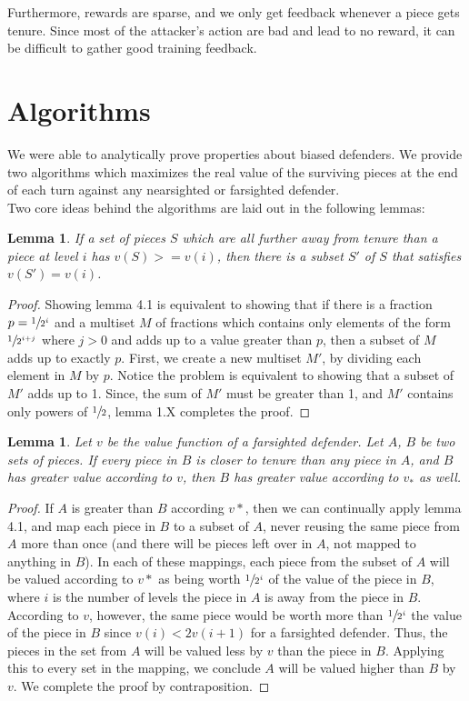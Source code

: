 \documentclass{article}
\theoremstyle{plain}
\newtheorem{lem}[thm]{Lemma}
\theoremstyle{definition}
\theoremstyle{remark}
\begin{document}
Furthermore, rewards are sparse, and we only get feedback whenever a piece gets tenure. Since most of the attacker's action are bad and lead to no reward, it can be difficult to gather good training feedback.
\section{Algorithms }
We were able to analytically prove properties about biased defenders. We provide two algorithms which maximizes the real value of the surviving pieces at the end of each turn against any nearsighted or farsighted defender.\\

Two core ideas behind the algorithms  are laid out in the following lemmas:

\begin{lem}
  If a set of pieces $S$ which are all further away from tenure than a piece at level $i$ has $v(S) >= v(i)$, then there is a subset $S'$ of $S$ that satisfies $v(S') = v(i)$.
\end{lem}


\begin{proof}
  Showing lemma 4.1 is equivalent to showing that if there is a fraction $p = \sfrac{1}{2^i}$ and a multiset $M$ of fractions which contains only elements of the form $\sfrac{1}{2^{i+j}}$ where $j>0$ and adds up to a value greater than $p$, then a subset of $M$ adds up to exactly $p$. First, we create a new multiset $M'$, by dividing each element in $M$ by $p$. Notice the problem is equivalent to showing that a subset of $M'$ adds up to 1. Since, the sum of $M'$ must be greater than 1, and $M'$ contains only powers of $\sfrac{1}{2}$, lemma 1.X completes the proof.
\end{proof}

\begin{lem}
  Let $v$ be the value function of a farsighted defender. Let $A$, $B$ be two sets of pieces. If every piece in $B$ is closer to tenure than any piece in $A$, and  $B$ has greater value according to $v$, then $B$ has greater value according to $v_{*}$ as well.
\end{lem}

\begin{proof}
  If $A$ is greater than $B$ according $v*$, then we can continually apply lemma 4.1, and map each piece in $B$ to a subset of $A$, never reusing the same piece from $A$ more than once (and there will be pieces left over in $A$, not mapped to anything in $B$). In each of these mappings, each piece from the subset of $A$ will be valued according to $v*$ as being worth $\sfrac{1}{2^i}$ of the value of the piece in $B$, where $i$ is the number of levels the piece in $A$ is away from the piece in $B$. According to $v$, however, the same piece would be worth more than $\sfrac{1}{2^i}$ the value of the piece in $B$ since $v(i) < 2v(i+1)$ for a farsighted defender. Thus, the pieces in the set from $A$ will be valued less by $v$ than the piece in $B$. Applying this to every set in the mapping, we conclude $A$ will be valued higher than $B$ by $v$. We complete the proof by contraposition.
\end{proof}
\end{document}
